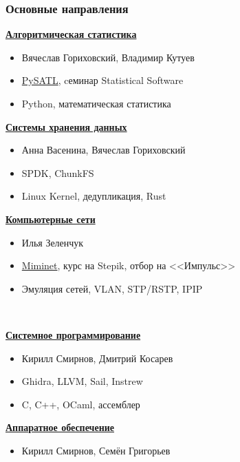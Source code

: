 \documentclass[xcolor=table,aspectratio=169]{beamer}
\begin{document}
\begin{frame}[fragile]
  \frametitle{Основные направления}
    \begin{minipage}{0.48\textwidth}
        \underline{\textbf{Алгоритмическая статистика}}
        \small{
        \begin{itemize}\setlength\itemsep{-0.4em}
          \item Вячеслав Гориховский, Владимир Кутуев
          \item \href{https://github.com/PySATL/}{PySATL}, cеминар Statistical Software
          \item Python, математическая статистика
        \end{itemize}
        }
        \underline{\textbf{ Системы хранения данных}}
        \small{
        \begin{itemize}\setlength\itemsep{-0.4em}
          \item Анна Васенина, Вячеслав Гориховский
          \item SPDK, ChunkFS
          \item Linux Kernel, дедупликация, Rust
        \end{itemize}
        }
        \underline{\textbf{Компьютерные сети}}
        \small{
        \begin{itemize}\setlength\itemsep{-0.4em}
          \item Илья Зеленчук
          \item \href{https://github.com/mimi-net/miminet}{Miminet}, курс на Stepik, отбор на <<Импульс>>
          \item Эмуляция сетей, VLAN, STP/RSTP, IPIP
        \end{itemize}
        }
    \end{minipage}~  
    \begin{minipage}{0.48\textwidth}
      \underline{\textbf{Системное программирование}}
      \small{
        \begin{itemize}\setlength\itemsep{-0.4em}
          \item Кирилл Смирнов, Дмитрий Косарев
          \item Ghidra, LLVM, Sail, Instrew
          \item C, C++, OCaml, ассемблер
        \end{itemize}
      }
        \underline{\textbf{Аппаратное обеспечение}}
        \small{
        \begin{itemize}\setlength\itemsep{-0.4em}
          \item Кирилл Смирнов, Семён Григорьев

\end{itemize}}
\end{minipage}
\end{frame}
\end{document}
